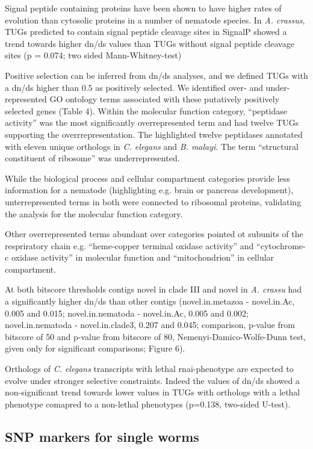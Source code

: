 \documentclass[10pt]{bmc_article}
\newenvironment{bmcformat}{\begin{raggedright}\baselineskip20pt\sloppy\setboolean{publ}{false}}{\end{raggedright}\baselineskip20pt\sloppy}
\begin{document}
\begin{bmcformat}
Signal peptide containing proteins have been shown to have higher
rates of evolution than cytosolic proteins in a number of nematode
species. In \textit{A. crassus}, TUGs predicted to contain signal
peptide cleavage sites in SignalP showed a trend towards higher dn/ds
values than TUGs without signal peptide cleavage sites (p =
0.074; two sided
Mann-Whitney-test) %

Positive selection can be inferred from dn/ds analyses, and we defined
TUGs with a dn/ds higher than 0.5 as positively selected. We
identified over- and under-represented GO ontology terms associated
with these putatively positively selected genes (Table 4). Within the
molecular function category, ``peptidase activity'' was the most
significantly overrepresented term and had twelve TUGs supporting the
overrrepresentation. The highlighted twelve peptidases annotated with
eleven unique orthologs in \textit{C. elegans} and \textit{B. malayi}.
The term ``structural constituent of ribosome'' was underrepresented.

While the biological process and cellular compartment categories
provide less information for a nematode (highlighting e.g. brain or
pancreas development), unterrepresented terms in both were connected
to ribosomal proteins, validating the analysis for the molecular
function category.

Other overrepresented terms abundant over categories pointed ot
subunits of the respriratory chain e.g. ``heme-copper terminal oxidase
activity'' and ``cytochrome-c oxidase activity'' in molecular function
and ``mitochondrion'' in cellular compartment.

At both bitscore thresholds contigs novel in clade III and novel in
\textit{A. crassu} had a significantly higher dn/ds than other contigs
(novel.in.metazoa - novel.in.Ac, 0.005 and 0.015; novel.in.nematoda -
novel.in.Ac, 0.005 and 0.002; novel.in.nematoda - novel.in.clade3,
0.207 and 0.045; comparison, p-value from bitscore of 50 and p-value
from bitscore of 80, Nemenyi-Damico-Wolfe-Dunn test, given only for
significant comparisons; Figure 6).

Orthologs of \textit{C. elegans} transcripts with lethal
rnai-phenotype are expected to evolve under stronger selective
constraints. Indeed the values of dn/ds showed a non-significant trend
towards lower values in TUGs with orthologs with a lethal phenotype
comapred to a non-lethal phenotypes
(p=0.138, two-sided U-test).

\subsection*{SNP markers for single worms}


\end{bmcformat}
\end{document}
